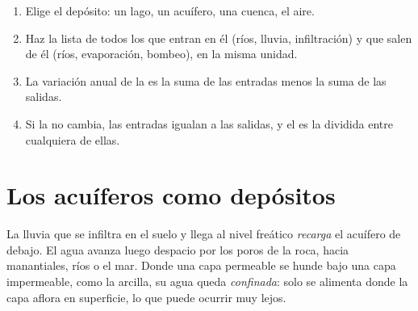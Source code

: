 \begin{method}\label{met:g10:freshwater-resources:budget}
\begin{enumerate}
  \item Elige el depósito: un lago, un acuífero, una cuenca, el aire.
  \item Haz la lista de todos los  que entran en él (ríos, lluvia,
        infiltración) y que salen de él (ríos, evaporación, bombeo), en la
        misma unidad.
  \item La variación anual de la  es la suma de las entradas menos la
        suma de las salidas.
  \item Si la  no cambia, las entradas igualan a las salidas, y el
         es la  dividida entre cualquiera de ellas.
\end{enumerate}
\end{method}

\section{Los acuíferos como depósitos}

La lluvia que se infiltra en el suelo y llega al nivel freático
\emph{recarga} el acuífero de debajo. El agua avanza luego despacio por los
poros de la roca, hacia manantiales, ríos o el mar. Donde una capa permeable
se hunde bajo una capa impermeable, como la arcilla, su agua queda
\emph{confinada}: solo se alimenta donde la capa aflora en superficie, lo que
puede ocurrir muy lejos.

